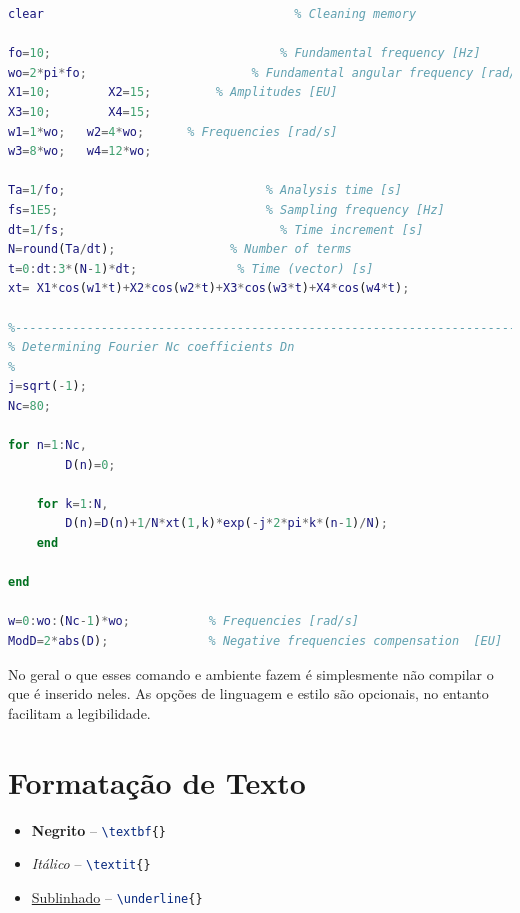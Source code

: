 \begin{lstlisting}[language=Matlab, style=Code]
clear							        % Cleaning memory

fo=10;							      % Fundamental frequency [Hz]
wo=2*pi*fo;                       % Fundamental angular frequency [rad/s]
X1=10;        X2=15;         % Amplitudes [EU]
X3=10;        X4=15;           
w1=1*wo;   w2=4*wo;      % Frequencies [rad/s]
w3=8*wo;   w4=12*wo;           

Ta=1/fo;						    % Analysis time [s]
fs=1E5;                             % Sampling frequency [Hz]
dt=1/fs;						      % Time increment [s]
N=round(Ta/dt);                % Number of terms
t=0:dt:3*(N-1)*dt;		  	    % Time (vector) [s]
xt= X1*cos(w1*t)+X2*cos(w2*t)+X3*cos(w3*t)+X4*cos(w4*t);

%----------------------------------------------------------------------------------------------------------
% Determining Fourier Nc coefficients Dn
%
j=sqrt(-1);
Nc=80;

for n=1:Nc,
		D(n)=0;
        
    for k=1:N,
        D(n)=D(n)+1/N*xt(1,k)*exp(-j*2*pi*k*(n-1)/N);
    end
    
end

w=0:wo:(Nc-1)*wo;   	    % Frequencies [rad/s]
ModD=2*abs(D);              % Negative frequencies compensation  [EU]
\end{lstlisting}

    No geral o que esses comando e ambiente fazem é simplesmente não compilar o que é inserido neles.
    As opções de linguagem e estilo são opcionais, no entanto facilitam a legibilidade.


\section{Formatação de Texto}
\label{sec:formatacao}

    \begin{itemize}
        \item \textbf{Negrito} -- \lstinline[language=TeX,style=code]|\textbf{}|
        \item \textit{Itálico} -- \lstinline[language=TeX,style=code]|\textit{}|
        \item \underline{Sublinhado} -- \lstinline[language=TeX,style=code]|\underline{}|
    \end{itemize}

